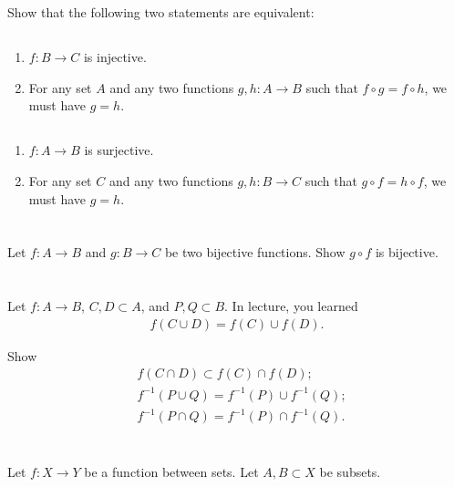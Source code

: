 \documentclass[11pt,letterpaper]{article}
\begin{document}
\section{}
Show that the following two statements are equivalent:

\subsection{}
\begin{enumerate}
    \item $f: B\to C$ is injective.
    \item For any set $A$ and any two functions $g,h: A\to B$ such that $f\circ g = f\circ h$, we must have $g=h$. 
\end{enumerate}

\subsection{}
\begin{enumerate}
    \item $f: A\to B$ is surjective.
    \item For any set $C$ and any two functions $g,h: B\to C$ such that $g\circ f = h\circ f$, we must have $g=h$. 
\end{enumerate}

\section{}
Let $f: A\to B$ and $g: B\to C$ be two bijective functions.  Show $g\circ f$ is bijective.

\section{}
Let $f: A\to B$, $C, D\subset A$, and $P, Q\subset B$. In lecture, you learned 
\begin{align}
    f(C\cup D) = f(C)\cup f(D).
\end{align}

Show
\begin{align}
    &f(C\cap D) \subset f(C)\cap f(D);\\
    &f^{-1}(P\cup Q) = f^{-1}(P)\cup f^{-1}(Q);\\
    &f^{-1}(P\cap Q) = f^{-1}(P)\cap f^{-1}(Q).
\end{align}

\section{}
Let $f: X\to Y$ be a function between sets. Let $A,B\subset X$ be subsets. 
\end{document}
